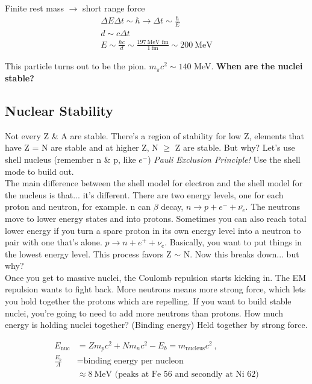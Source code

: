 Finite rest mass $\rightarrow$ short range force\\ 

\begin{eqnarray}
\Delta E \Delta t \sim \hbar \rightarrow \Delta t \sim \frac{\hbar}{E}\\
d \sim c \Delta t\\
E \sim \frac{\hbar c}{d} \sim \frac{ 197 ~\text{MeV fm}}{1 ~\text{fm}} \sim 200~ \text{MeV}
\end{eqnarray}

This particle turns out to be the pion. $m_\pi c^2 \sim 140$ MeV. \textbf{When are the nuclei stable? }

\subsection{Nuclear Stability}
Not every Z \& A are stable. There's a region of stability for low Z, elements that have Z = N are stable and at higher Z, N $\geq$ Z are stable. But why? Let's use shell nucleus (remember n \& p, like $e^-$) \textit{Pauli Exclusion Principle!} Use the shell mode to build out. \\

The main difference between the shell model for electron and the shell model for the nucleus is that... it's different. There are two energy levels, one for each proton and neutron, for example. n can $\beta$ decay, $n \rightarrow p + e^- + \overline{\nu_e}$. The neutrons move to lower energy states and into protons. Sometimes you can also reach total lower energy if you turn a spare proton in its own energy level into a neutron to pair with one that's alone. $ p \rightarrow n + e^+ + \nu_e$. Basically, you want to put things in the lowest energy level. This process favors Z $\sim$ N. Now this breaks down... but why? \\
Once you get to massive nuclei, the Coulomb repulsion starts kicking in. The EM repulsion wants to fight back. More neutrons means more strong force, which lets you hold together the protons which are repelling. If you want to build stable nuclei, you're going to need to add more neutrons than protons. How much energy is holding nuclei together? (Binding energy) Held together by strong force. 

\begin{align}
E_\text{nuc} & = Zm_pc^2 + N m_n c^2 -E_b = m_\text{nucleus}c^2~,\\
\frac{E_b}{A} & = \text{binding energy per nucleon}\\
& \approx 8~\text{MeV (peaks at Fe 56 and secondly at Ni 62)}
\end{align}

